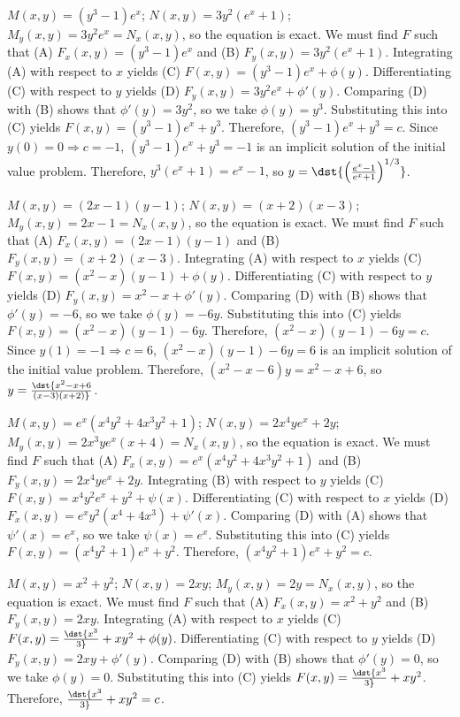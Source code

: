 \documentclass[dvips]{book}
\renewcommand{\exer}[1]{\par\medskip\;\noindent{\color{red}\bf #1.}}
\numberwithin{example}{section}
\numberwithin{equation}{section}
\numberwithin{theorem}{section}
\numberwithin{table}{section}
\numberwithin{figure}{section}
\begin{document}
\exer{2.5.20}
$M(x,y)=(y^3-1)e^x$;\;
$N(x,y)=3y^2(e^x+1)$;\;
$M_y(x,y)=3y^2e^x=N_x(x,y)$,
so the  equation is exact.
We must find $F$ such that
(A) $F_x(x,y)=(y^3-1)e^x$ and
(B) $F_y(x,y)=3y^2(e^x+1)$.
Integrating (A) with respect to $x$ yields
(C) $F(x,y)=(y^3-1)e^x+\phi(y)$.
Differentiating (C) with respect to $y$  yields
(D) $F_y(x,y)=3y^2e^x+\phi'(y)$.
Comparing (D) with (B)  shows that
$\phi'(y)=3y^2$, so we take
$\phi(y)=y^3$.
Substituting this into (C) yields
$F(x,y)=(y^3-1)e^x+y^3$.
Therefore, $(y^3-1)e^x+y^3=c$.
Since $y(0)=0\Rightarrow c=-1$,
$(y^3-1)e^x+y^3=-1$ is an implicit solution of  the initial value
problem. Therefore, $y^3(e^x+1)=e^x-1$, so
$y=\dst{\left(e^x-1\over e^x+1\right)^{1/3}}$.


\exer{2.5.22}
$M(x,y)=(2x-1)(y-1)$;\;
$N(x,y)=(x+2)(x-3)$;\;
$M_y(x,y)=2x-1=N_x(x,y)$,
so the  equation is exact.
We must find $F$ such that
(A) $F_x(x,y)=(2x-1)(y-1)$ and
(B) $F_y(x,y)=(x+2)(x-3)$.
Integrating (A) with respect to $x$ yields
(C) $F(x,y)=(x^2-x)(y-1)+\phi(y)$.
Differentiating (C) with respect to $y$  yields
(D) $F_y(x,y)=x^2-x+\phi'(y)$.
Comparing (D) with (B)  shows that
$\phi'(y)=-6$, so we take
$\phi(y)=-6y$.
Substituting this into (C) yields
$F(x,y)=(x^2-x)(y-1)-6y$.
Therefore, $(x^2-x)(y-1)-6y=c$.
Since $y(1)=-1\Rightarrow c=6$,
$(x^2-x)(y-1)-6y=6$ is an implicit solution of  the initial value
problem. Therefore, $(x^2-x-6)y=x^2-x+6$, so
$y=\dst{x^2-x+6\over(x-3)(x+2)}$.


\exer{2.5.24}
$M(x,y)=e^x(x^4y^2+4x^3y^2+1)$;\;
$N(x,y)=2x^4ye^x+2y$;\;
$M_y(x,y)=2x^3ye^x(x+4)=N_x(x,y)$,
so the  equation is  exact.
We must find $F$ such that
(A) $F_x(x,y)=e^x(x^4y^2+4x^3y^2+1)$ and
(B) $F_y(x,y)=2x^4ye^x+2y$.
Integrating (B) with respect to $y$ yields
(C) $F(x,y)=x^4y^2e^x+y^2+\psi(x)$.
Differentiating (C) with respect to $x$  yields
(D) $F_x(x,y)=e^xy^2(x^4+4x^3)+\psi'(x)$.
Comparing (D) with (A)  shows that
$\psi'(x)=e^x$, so we take
$\psi(x)=e^x$.
Substituting this into (C) yields
$F(x,y)=(x^4y^2+1)e^x+y^2$.
Therefore, $(x^4y^2+1)e^x+y^2=c$.


\exer{2.5.28}
$M(x,y)=x^2+y^2$;\;
$N(x,y)=2xy$;\;
$M_y(x,y)=2y=N_x(x,y)$,
so the  equation is exact.
We must find $F$ such that
(A) $F_x(x,y)=x^2+y^2$ and
(B) $F_y(x,y)=2xy$.
Integrating (A) with respect to $x$ yields
(C) $F(x,y)=\dst{x^3\over3}+xy^2+\phi(y)$.
Differentiating (C) with respect to $y$  yields
(D) $F_y(x,y)=2xy+\phi'(y)$.
Comparing (D) with (B)  shows that
$\phi'(y)=0$, so we take
$\phi(y)=0$.
Substituting this into (C) yields
$F(x,y)=\dst{x^3\over3}+xy^2$.
Therefore, $\dst{x^3\over3}+xy^2=c$.
\end{document}
